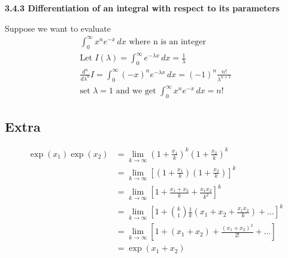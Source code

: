 \textbf{3.4.3 Differentiation of an integral with respect to its parameters}

\begin{example}
Suppose we want to evaluate
\begin{align*}
    \int_{0}^{\infty} x^n e^{-x} \,dx \text{ where n is an integer} \\
    \text{Let } I(\lambda) = \int_{0}^{\infty} e^{-\lambda x} \,dx = \frac{1}{\lambda} \\
    \frac{d^n}{d \lambda^n} I = \int_{0}^{\infty} (-x)^n e^{-\lambda x} \,dx = (-1)^n \frac{n!}{\lambda^{n + 1}} \\
    \text{set } \lambda = 1 \text{ and we get } \int_{0}^{\infty} x^n e^{-x} \,dx = n!
\end{align*}
\end{example}



\subsection{Extra}

\begin{align*}
    \exp \left(x_1 \right) \exp \left(x_2 \right) &= \lim_{k \to \infty} \left(1 + \frac{x_1}{k}\right)^k \left(1 + \frac{x_2}{k}\right)^k \\
    &= \lim_{k \to \infty} \left[ \left(1 + \frac{x_1}{k}\right)\left(1 + \frac{x_2}{k}\right) \right]^k \\
    &= \lim_{k \to \infty} \left[ 1 + \frac{x_1 + x_2}{k} + \frac{x_1 x_2}{k^2} \right]^k \\
    &= \lim_{k \to \infty} \left[ 1 + \binom{k}{1} \frac{1}{k} \left(x_1 + x_2 + \frac{x_1 x_2}{k} \right) + \ldots \right]^k \\
    &= \lim_{k \to \infty} \left[ 1 + \left( x_1 + x_2 \right) + \frac{\left( x_1 + x_2 \right)^2}{2!} + \ldots \right] \\
    &= \exp \left( x_1 + x_2 \right)
\end{align*}

%  


 

 


